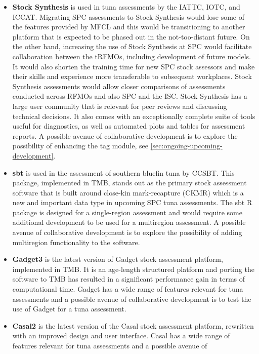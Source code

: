 \documentclass{SCreport}
\begin{document}
\begin{itemize}
  \item \textbf{Stock Synthesis} is used in tuna assessments by the IATTC, IOTC,
  and ICCAT. Migrating SPC assessments to Stock Synthesis would lose some of the
  features provided by MFCL and this would be transitioning to another platform
  that is expected to be phased out in the not-too-distant future. On the other
  hand, increasing the use of Stock Synthesis at SPC would facilitate
  collaboration between the tRFMOs, including development of future models. It
  would also shorten the training time for new SPC stock assessors and make
  their skills and experience more transferable to subsequent workplaces. Stock
  Synthesis assessments would allow closer comparisons of assessments conducted
  across RFMOs and also SPC and the ISC. Stock Synthesis has a large user
  community that is relevant for peer reviews and discussing technical
  decisions. It also comes with an exceptionally complete suite of tools useful
  for diagnostics, as well as automated plots and tables for assessment reports.
  A possible avenue of collaborative development is to explore the possibility
  of enhancing the tag module, see \autoref{sec:ongoing-upcoming-development}.
  \item \textbf{sbt} is used in the assessment of southern bluefin tuna by
  CCSBT. This package, implemented in TMB, stands out as the primary stock
  assessment software that is built around close-kin mark-recapture (CKMR) which
  is a new and important data type in upcoming SPC tuna assessments. The
  \textsf{sbt} R package is designed for a single-region assessment and would
  require some additional development to be used for a multiregion assessment. A
  possible avenue of collaborative development is to explore the possibility of
  adding multiregion functionality to the software.
  \item \textbf{Gadget3} is the latest version of Gadget stock assessment
  platform, implemented in TMB. It is an age-length structured platform and
  porting the software to TMB has resulted in a significant performance gain in
  terms of computational time. Gadget has a wide range of features relevant for
  tuna assessments and a possible avenue of collaborative development is to test
  the use of Gadget for a tuna assessment.
  \item \textbf{Casal2} is the latest version of the Casal stock assessment
  platform, rewritten with an improved design and user interface. Casal has a
  wide range of features relevant for tuna assessments and a possible avenue of

\end{itemize}
\end{document}
